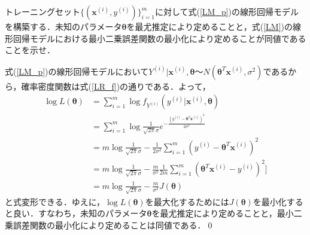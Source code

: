 \begin{qu}
トレーニングセット$\{({\bm x}^{(i)},y^{(i)})\}_{i=1}^m$に対して式(\ref{LM_p})の線形回帰モデルを構築する．未知のパラメータ${\bm \theta}$を最尤推定により定めることと，式(\ref{LM})の線形回帰モデルにおける最小二乗誤差関数の最小化により定めることが同値であることを示せ．
\end{qu}
\begin{ans}
式(\ref{LM_p})の線形回帰モデルにおいて$Y^{(i)}|{\bm x}^{(i)},{\bm \theta}〜N({\bm \theta}^T {\bm x}^{(i)},\sigma^2)$であるから，確率密度関数は式(\ref{LR_f})の通りである．よって，
\begin{align*}
\log L({\bm \theta})&=\sum_{i=1}^m \log f_{Y^{(i)}}(y^{(i)}|{\bm x}^{(i)},{\bm \theta})\\
&=\sum_{i=1}^m \log \frac{1}{\sqrt{2\pi }\sigma}e^{-\frac{(y^{(i)}-{\bm \theta}^T {\bm x}^{(i)})^2}{2\sigma^2}}\\
&= m \log \frac{1}{\sqrt{2\pi }\sigma}-\frac{1}{2\sigma^2}\sum_{i=1}^m(y^{(i)}-{\bm \theta}^T {\bm x}^{(i)})^2\\
&= m \log \frac{1}{\sqrt{2\pi }\sigma}-\frac{m}{\sigma^2}\frac{1}{2m}\sum_{i=1}^m({\bm \theta}^T {\bm x}^{(i)}-y^{(i)})^2]\\
&=m \log \frac{1}{\sqrt{2\pi }\sigma}-\frac{m}{\sigma^2}J({\bm \theta})
\end{align*}
と式変形できる．ゆえに，$\log L({\bm \theta})$を最大化するためには$J({\bm \theta})$を最小化すると良い．すなわち，未知のパラメータ${\bm \theta}$を最尤推定により定めることと，最小二乗誤差関数の最小化により定めることは同値である．\qed
\end{ans}






